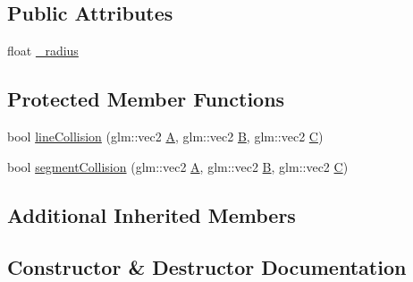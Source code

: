 \subsection*{Public Attributes}
\begin{DoxyCompactItemize}
\item 
float \mbox{\hyperlink{class_beer_engine_1_1_component_1_1_circle_collider_abbf603985bff01588e81fdf689925f25}{\+\_\+radius}}
\end{DoxyCompactItemize}
\subsection*{Protected Member Functions}
\begin{DoxyCompactItemize}
\item 
bool \mbox{\hyperlink{class_beer_engine_1_1_component_1_1_circle_collider_aa22028b1fe83dd484df5bbf4679e4fa0}{line\+Collision}} (glm\+::vec2 \mbox{\hyperlink{namespace_beer_engine_a94f0b552f6dc910de8cdb44207981f53ab506e1e75f82c0416b75881bbe0946aa}{A}}, glm\+::vec2 \mbox{\hyperlink{namespace_beer_engine_a94f0b552f6dc910de8cdb44207981f53ad312fd34bf6e7f057de8b8391e3ea76d}{B}}, glm\+::vec2 \mbox{\hyperlink{namespace_beer_engine_a94f0b552f6dc910de8cdb44207981f53afc52c023535c7df9670484281809b3f8}{C}})
\item 
bool \mbox{\hyperlink{class_beer_engine_1_1_component_1_1_circle_collider_a550fcf999e3e8560ba1592df2afa69d0}{segment\+Collision}} (glm\+::vec2 \mbox{\hyperlink{namespace_beer_engine_a94f0b552f6dc910de8cdb44207981f53ab506e1e75f82c0416b75881bbe0946aa}{A}}, glm\+::vec2 \mbox{\hyperlink{namespace_beer_engine_a94f0b552f6dc910de8cdb44207981f53ad312fd34bf6e7f057de8b8391e3ea76d}{B}}, glm\+::vec2 \mbox{\hyperlink{namespace_beer_engine_a94f0b552f6dc910de8cdb44207981f53afc52c023535c7df9670484281809b3f8}{C}})
\end{DoxyCompactItemize}
\subsection*{Additional Inherited Members}


\subsection{Constructor \& Destructor Documentation}
\mbox{\label{class_beer_engine_1_1_component_1_1_circle_collider_ae79d96d3b73a4a43d9305da69e739ac0}} 

